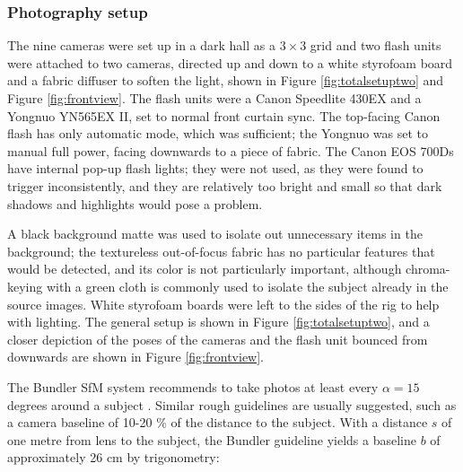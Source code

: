 \subsubsection{Photography setup}

The nine cameras were set up in a dark hall as a $3 \times 3$ grid and two flash units were attached to two cameras, directed up and down to a white styrofoam board and a fabric diffuser to soften the light, shown in Figure \ref{fig:totalsetuptwo} and Figure \ref{fig:frontview}.
The flash units were a Canon Speedlite 430EX and a Yongnuo YN565EX II, set to normal front curtain sync.
The top-facing Canon flash has only automatic mode, which was sufficient; the Yongnuo was set to manual full power, facing downwards to a piece of fabric.
The Canon EOS 700Ds have internal pop-up flash lights; they were not used, as they were found to trigger inconsistently, and they are relatively too bright and small so that dark shadows and highlights would pose a problem.

A black background matte was used to isolate out unnecessary items in the background;
the textureless out-of-focus fabric has no particular features that would be detected, and its color is not particularly important, although chroma-keying with a green cloth is commonly used to isolate the subject already in the source images.
White styrofoam boards were left to the sides of the rig to help with lighting.
The general setup is shown in Figure \ref{fig:totalsetuptwo}, and a closer depiction of the poses of the cameras and the flash unit bounced from downwards are shown in Figure \ref{fig:frontview}.



%
%


The Bundler SfM system recommends to take photos at least every $\alpha = 15$ degrees around a subject \cite{bundlerfaq}.
Similar rough guidelines are usually suggested, such as a camera baseline of 10-20 \% of the distance to the subject.
With a distance $s$ of one metre from lens to the subject, the Bundler guideline yields a baseline $b$ of approximately 26 cm by trigonometry: %

